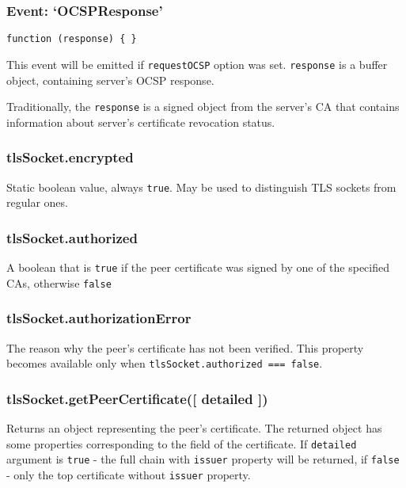 \subsubsection{\texorpdfstring{Event:
`OCSPResponse'}{Event: OCSPResponse}}\label{event-ocspresponse}

\texttt{function\ (response)\ \{\ \}}

This event will be emitted if \texttt{requestOCSP} option was set.
\texttt{response} is a buffer object, containing server's OCSP response.

Traditionally, the \texttt{response} is a signed object from the
server's CA that contains information about server's certificate
revocation status.

\subsubsection{tlsSocket.encrypted}\label{tlssocket.encrypted}

Static boolean value, always \texttt{true}. May be used to distinguish
TLS sockets from regular ones.

\subsubsection{tlsSocket.authorized}\label{tlssocket.authorized}

A boolean that is \texttt{true} if the peer certificate was signed by
one of the specified CAs, otherwise \texttt{false}

\subsubsection{tlsSocket.authorizationError}\label{tlssocket.authorizationerror}

The reason why the peer's certificate has not been verified. This
property becomes available only when
\texttt{tlsSocket.authorized\ ===\ false}.

\subsubsection{tlsSocket.getPeerCertificate({[} detailed
{]})}\label{tlssocket.getpeercertificate-detailed}

Returns an object representing the peer's certificate. The returned
object has some properties corresponding to the field of the
certificate. If \texttt{detailed} argument is \texttt{true} - the full
chain with \texttt{issuer} property will be returned, if \texttt{false}
- only the top certificate without \texttt{issuer} property.

